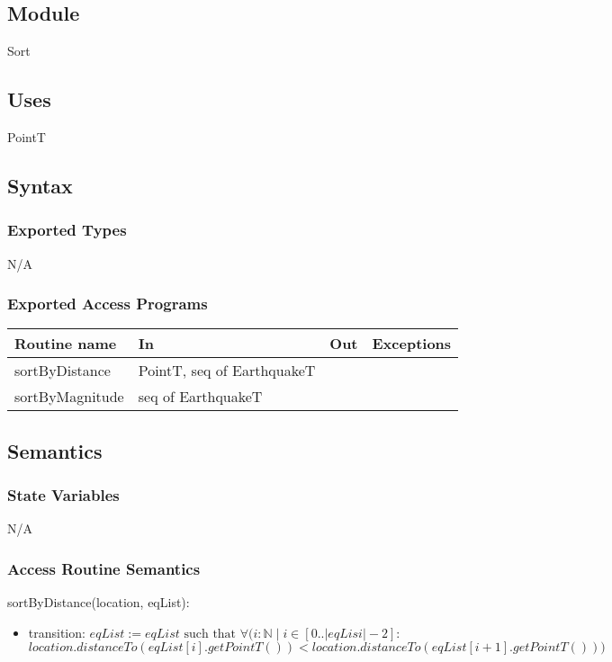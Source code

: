 \documentclass[12pt]{article}
\begin{document}
\subsection* {Module}

Sort

\subsection* {Uses}

PointT

\subsection* {Syntax}

\subsubsection* {Exported Types}

N/A


\subsubsection* {Exported Access Programs}

\begin{tabular}{| l | l | l | l |}
\hline
\textbf{Routine name} & \textbf{In} & \textbf{Out} & \textbf{Exceptions}\\
\hline
sortByDistance & PointT, seq of EarthquakeT &  & \\
\hline
sortByMagnitude & seq of EarthquakeT &  & \\
\hline
\end{tabular}

\subsection* {Semantics}

\subsubsection* {State Variables}

N/A


\subsubsection* {Access Routine Semantics}

\noindent sortByDistance(location, eqList):
\begin{itemize}
\item transition: $\mathit{eqList} := eqList  
\mbox{ such that } \forall (i : \mathbb{N} \;|\; i \in [0..|eqLisi| - 2] :$ \\
 $location.distanceTo(eqList[i].getPointT()) < location.distanceTo(eqList[i + 1].getPointT()))$
\end{itemize}
\end{document}
